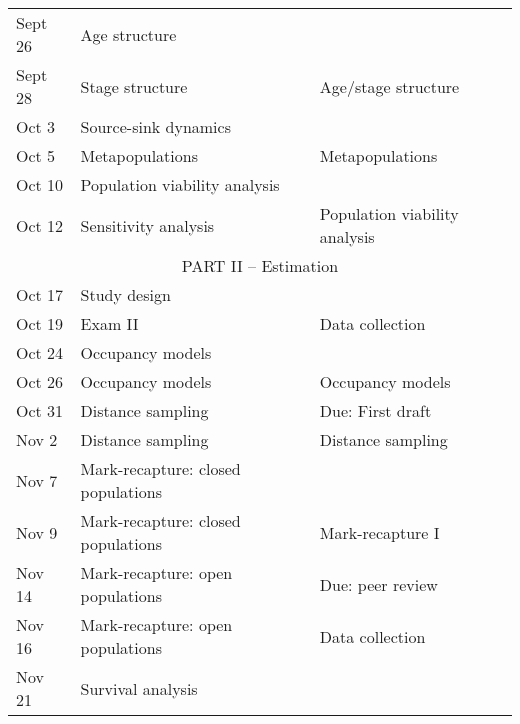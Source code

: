 \documentclass[12pt]{article}
\begin{document}
\begin{center}
\begin{tabular}[c]{lll}
\hline
Sept 26    & Age structure                      &                                      \\
Sept 28    & Stage structure                    & Age/stage structure                  \\
\hline
Oct 3      & Source-sink dynamics               &                                      \\
Oct 5      & Metapopulations                    & Metapopulations                      \\
\hline
Oct 10     & Population viability analysis      &                                      \\
Oct 12     & Sensitivity analysis               & Population viability analysis        \\
\hline
           \multicolumn{3}{c}{PART II -- Estimation}                                   \\
\hline
Oct 17     & Study design                       &                                      \\
Oct 19     & Exam II                            & Data collection                      \\
\hline
Oct 24     & Occupancy models                   &                                      \\
Oct 26     & Occupancy models                   & Occupancy models                     \\
\hline
Oct 31     & Distance sampling                  & Due: First draft                     \\
Nov 2      & Distance sampling                  & Distance sampling                    \\
\hline
Nov 7      & Mark-recapture: closed populations &                                      \\
Nov 9      & Mark-recapture: closed populations & Mark-recapture I                     \\
\hline
Nov 14     & Mark-recapture: open populations   & Due: peer review                     \\
Nov 16     & Mark-recapture: open populations   & Data collection                      \\
\hline
Nov 21     & Survival analysis                  &                                      \\

\end{tabular}
\end{center}
\end{document}
